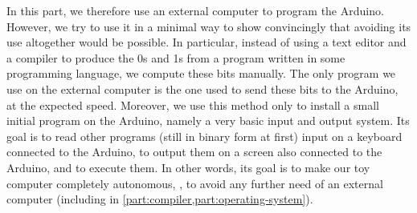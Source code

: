 In this part, we therefore use an external computer to program the Arduino.
However, we try to use it in a minimal way to show convincingly that avoiding
its use altogether would be possible. In particular, instead of using a text
editor and a compiler to produce the 0s and 1s from a program written in some
programming language, we compute these bits manually. The only program we use
on the external computer is the one used to send these bits to the Arduino, at
the expected speed. Moreover, we use this method only to install a small
initial program on the Arduino, namely a very basic input and output system.
Its goal is to read other programs (still in binary form at first) input on a
keyboard connected to the Arduino, to output them on a screen also connected to
the Arduino, and to execute them. In other words, its goal is to make our toy
computer completely autonomous, \ie, to avoid any further need of an external
computer (including in \cref{part:compiler,part:operating-system}).

